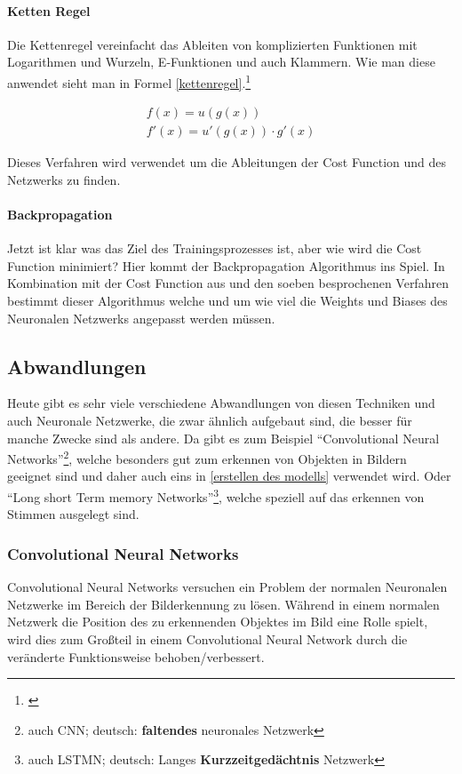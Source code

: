 \paragraph{Ketten Regel}\label{parachain}

Die Kettenregel vereinfacht das Ableiten von komplizierten Funktionen mit Logarithmen und Wurzeln, E-Funktionen und auch Klammern. Wie man diese anwendet sieht man in Formel \ref{kettenregel}.\footnote{\cite{kettenregel}}

\begin{equation}\label{kettenregel}
    \begin{matrix}
        f(x) = u(g(x))\\
        f'(x) = u'(g(x)) \cdot g'(x)
    \end{matrix}
\end{equation}

Dieses Verfahren wird verwendet um die Ableitungen der Cost Function und des Netzwerks zu finden.

\paragraph{Backpropagation}

Jetzt ist klar was das Ziel des Trainingsprozesses ist, aber wie wird die Cost Function minimiert? Hier kommt der Backpropagation Algorithmus ins Spiel. In Kombination mit der Cost Function aus und den soeben besprochenen Verfahren bestimmt dieser Algorithmus welche und um wie viel die Weights und Biases des Neuronalen Netzwerks angepasst werden müssen.

\subsection{Abwandlungen}

Heute gibt es sehr viele verschiedene Abwandlungen von diesen Techniken und auch Neuronale Netzwerke, die zwar ähnlich aufgebaut sind, die besser für manche Zwecke sind als andere. Da gibt es zum Beispiel "`Convolutional Neural Networks"'\footnote{auch CNN; deutsch: \textbf{faltendes} neuronales Netzwerk}, welche besonders gut zum erkennen von Objekten in Bildern geeignet sind und daher auch eins in \ref{erstellen des modells} verwendet wird. Oder "`Long short Term memory Networks"'\footnote{auch LSTMN; deutsch: Langes \textbf{Kurzzeitgedächtnis} Netzwerk}, welche speziell auf das erkennen von Stimmen ausgelegt sind.

\subsubsection{Convolutional Neural Networks}

Convolutional Neural Networks versuchen ein Problem der normalen Neuronalen Netzwerke im Bereich der Bilderkennung zu lösen. Während in einem normalen Netzwerk die Position des zu erkennenden Objektes im Bild eine Rolle spielt, wird dies zum Großteil in einem Convolutional Neural Network durch die veränderte Funktionsweise behoben/verbessert.